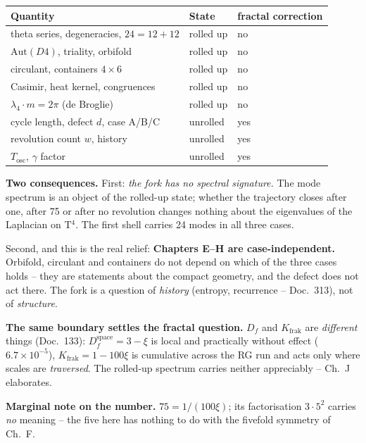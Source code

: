 \documentclass[11pt]{report}
\begin{document}
\begin{center}
\begin{tabular}{lll}
\toprule
Quantity & State & fractal correction \\
\midrule
theta series, degeneracies, $24 = 12+12$ & rolled up & no \\
$\text{Aut}(D4)$, triality, orbifold & rolled up & no \\
circulant, containers $4\times6$ & rolled up & no \\
Casimir, heat kernel, congruences & rolled up & no \\
$\lambda_4\cdot m = 2\pi$ (de Broglie) & rolled up & no \\
\midrule
cycle length, defect $d$, case A/B/C & unrolled & yes \\
revolution count $w$, history & unrolled & yes \\
$T_\text{osc}$, $\gamma$ factor & unrolled & yes \\
\bottomrule
\end{tabular}
\end{center}

\textbf{Two consequences.} First: \emph{the fork has no spectral
signature.} The mode spectrum is an object of the rolled-up state;
whether the trajectory closes after one, after 75 or after no
revolution changes nothing about the eigenvalues of the Laplacian
on T$^4$. The first shell carries 24 modes in all three cases.

Second, and this is the real relief: \textbf{Chapters E--H are
case-independent.} Orbifold, circulant and containers do not
depend on which of the three cases holds -- they are statements
about the compact geometry, and the defect does not act there. The
fork is a question of \emph{history} (entropy, recurrence --
Doc.~313), not of \emph{structure}.

\textbf{The same boundary settles the fractal question.} $D_f$ and
$K_\text{frak}$ are \emph{different} things (Doc.~133):
$D_f^\text{space} = 3-\xi$ is local and practically without effect
($6.7\times10^{-5}$), $K_\text{frak} = 1-100\xi$ is cumulative
across the RG run and acts only where scales are \emph{traversed}.
The rolled-up spectrum carries neither appreciably -- Ch.~J
elaborates.

\textbf{Marginal note on the number.} $75 = 1/(100\xi)$; its
factorisation $3\cdot5^2$ carries \emph{no} meaning -- the five
here has nothing to do with the fivefold symmetry of Ch.~F.

\end{document}
